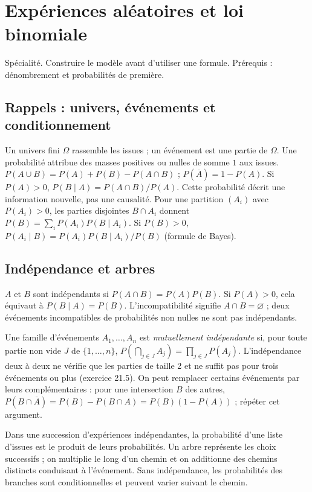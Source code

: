 \documentclass[../cours_tle.tex]{subfiles}
\begin{document}
\setcounter{chapter}{20}
\chapter{Expériences aléatoires et loi binomiale}
\label{ch:21}
\begin{objectif}
Spécialité. Construire le modèle avant d'utiliser une formule. Prérequis : dénombrement et probabilités de première.
\end{objectif}
\section{Rappels : univers, événements et conditionnement}
Un univers fini $\Omega$ rassemble les issues ; un événement est une partie de $\Omega$. Une probabilité attribue des masses positives ou nulles de somme $1$ aux issues.
$P(A\cup B)=P(A)+P(B)-P(A\cap B)$ ; $P(\overline A)=1-P(A)$.
Si $P(A)>0$, $P(B\mid A)=P(A\cap B)/P(A)$. Cette probabilité décrit une information nouvelle, pas une causalité.
Pour une partition $(A_i)$ avec $P(A_i)>0$, les parties disjointes $B\cap A_i$ donnent
$P(B)=\sum_iP(A_i)P(B\mid A_i)$.
Si $P(B)>0$, $P(A_i\mid B)=P(A_i)P(B\mid A_i)/P(B)$ (formule de Bayes).
\section{Indépendance et arbres}
$A$ et $B$ sont indépendants si $P(A\cap B)=P(A)P(B)$. Si $P(A)>0$, cela équivaut à $P(B\mid A)=P(B)$.
L'incompatibilité signifie $A\cap B=\varnothing$ ; deux événements incompatibles de probabilités non nulles ne sont pas indépendants.

Une famille d'événements $A_1,\ldots,A_n$ est \emph{mutuellement indépendante} si, pour toute partie non vide $J$ de $\{1,\ldots,n\}$,
$P(\bigcap_{j\in J}A_j)=\prod_{j\in J}P(A_j)$.
L'indépendance deux à deux ne vérifie que les parties de taille 2 et ne suffit pas pour trois événements ou plus (exercice 21.5).
On peut remplacer certains événements par leurs complémentaires : pour une intersection $B$ des autres,
$P(B\cap\overline A)=P(B)-P(B\cap A)=P(B)(1-P(A))$ ; répéter cet argument.

Dans une succession d'expériences indépendantes, la probabilité d'une liste d'issues est le produit de leurs probabilités. Un arbre représente les choix successifs ; on multiplie le long d'un chemin et on additionne des chemins distincts conduisant à l'événement.
Sans indépendance, les probabilités des branches sont conditionnelles et peuvent varier suivant le chemin.
\end{document}
